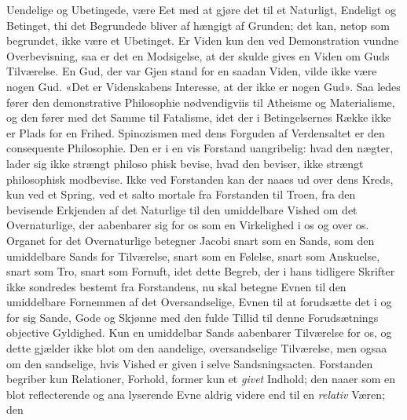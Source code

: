 \documentclass[12pt,a4paper]{book}
\begin{document}
Uendelige og Ubetingede, være Eet med at gjøre det til et
Naturligt, Endeligt og Betinget, thi det Begrundede bliver af\-%
hængigt af Grunden; det kan, netop som begrundet, ikke
være et Ubetinget. Er Viden kun den ved Demonstration
vundne Overbevisning, saa er det en Modsigelse, at der skulde
gives en Viden om Guds Tilværelse. En Gud, der var Gjen\-%
stand for en saadan Viden, vilde ikke være nogen Gud. «Det
er Videnskabens Interesse, at der ikke er nogen Gud». Saa\-%
ledes fører den demonstrative Philosophie nødvendigviis til
Atheisme og Materialisme, og den fører med det Samme til
Fatalisme, idet der i Betingelsernes Række ikke er Plads for
en Frihed. Spinozismen med dens Forguden af Verdensaltet
er den consequente Philosophie. Den er i en vis Forstand
uangribelig: hvad den nægter, lader sig ikke strængt philoso\-%
phisk bevise, hvad den beviser, ikke strængt philosophisk
modbevise. Ikke ved Forstanden kan der naaes ud over dens
Kreds, kun ved et Spring, ved et salto mortale fra Forstanden
til Troen, fra den bevisende Erkjenden af det Naturlige til
den umiddelbare Vished om det Overnaturlige, der aabenbarer
sig for os som en Virkelighed i os og over os. Organet for det
Overnaturlige betegner Jacobi snart som en Sands, som den
umiddelbare Sands for Tilværelse, snart som en Følelse, snart
som Anskuelse, snart som Tro, snart som Fornuft, idet dette
Begreb, der i hans tidligere Skrifter ikke sondredes bestemt
fra Forstandens, nu skal betegne Evnen til den umiddelbare
Fornemmen af det Oversandselige, Evnen til at forudsætte det
i og for sig Sande, Gode og Skjønne med den fulde Tillid til
denne Forudsætnings objective Gyldighed. Kun en umiddelbar
Sands aabenbarer Tilværelse for os, og dette gjælder ikke blot
om den aandelige, oversandselige Tilværelse, men ogsaa om
den sandselige, hvis Vished er given i selve Sandsningsacten.
Forstanden begriber kun Relationer, Forhold, former kun et
\emph{givet} Indhold; den naaer som en blot reflecterende og ana\-%
lyserende Evne aldrig videre end til en \emph{relativ} Væren; den
\end{document}
